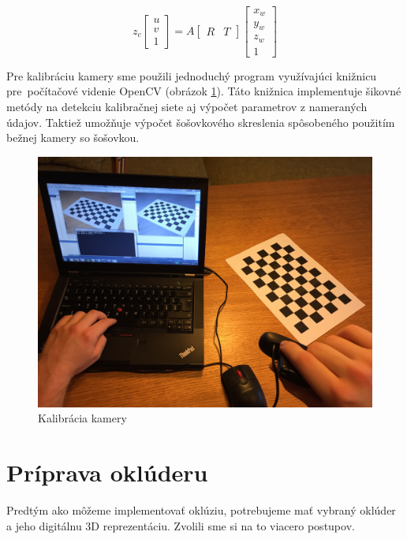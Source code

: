 \[
z_{c}\begin{bmatrix}
u\\
v\\
1\end{bmatrix}=A \begin{bmatrix}
R & T\end{bmatrix}\begin{bmatrix}
x_{w}\\
y_{w}\\
z_{w}\\
1\end{bmatrix}
\]

Pre kalibráciu kamery sme použili jednoduchý program využívajúci knižnicu pre~počítačové videnie OpenCV (obrázok \ref{kalib}). Táto knižnica implementuje šikovné metódy na detekciu kalibračnej siete aj výpočet parametrov z nameraných údajov. Taktiež umožňuje výpočet šošovkového skreslenia spôsobeného použitím bežnej kamery so šošovkou.

\begin{figure}[h]
 \centering
 \includegraphics[max width=\textwidth]{pictures/kalibracia-foto.jpg}
 \caption{Kalibrácia kamery}
 \label{kalib}
 \end{figure}

\section{Príprava oklúderu}

Predtým ako môžeme implementovať oklúziu, potrebujeme mať vybraný oklúder a jeho digitálnu 3D reprezentáciu. Zvolili sme si na to viacero postupov.

